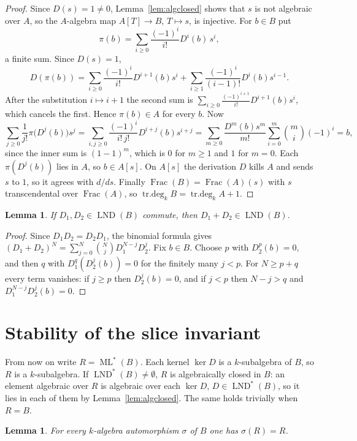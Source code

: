 \documentclass[11pt]{amsart}
\newtheorem{lemma}[theorem]{Lemma}
\theoremstyle{definition}
\DeclareMathOperator{\ML}{ML}
\DeclareMathOperator{\LND}{LND}
\DeclareMathOperator{\Frac}{Frac}
\DeclareMathOperator{\trdeg}{tr.deg}
\newcommand{\MLs}{\ML^{*}}
\newcommand{\LNDs}{\LND^{*}}
\newcommand{\td}[1]{\trdeg_k #1}
\begin{document}
\begin{proof}
Since $D(s)=1\neq0$, Lemma~\ref{lem:algclosed} shows that $s$ is not algebraic over $A$, so the $A$-algebra map $A[T]\to B$, $T\mapsto s$, is injective. For $b\in B$ put
\[
\pi(b)=\sum_{i\ge0}\frac{(-1)^i}{i!}D^i(b)\,s^i ,
\]
a finite sum. Since $D(s)=1$,
\[
D(\pi(b))=\sum_{i\ge0}\frac{(-1)^i}{i!}D^{i+1}(b)s^i+\sum_{i\ge1}\frac{(-1)^i}{(i-1)!}D^i(b)s^{i-1}.
\]
After the substitution $i\mapsto i+1$ the second sum is $\sum_{i\ge0}\frac{(-1)^{i+1}}{i!}D^{i+1}(b)s^i$, which cancels the first. Hence $\pi(b)\in A$ for every $b$. Now
\[
\sum_{j\ge0}\frac{1}{j!}\pi\bigl(D^j(b)\bigr)s^j=\sum_{i,j\ge0}\frac{(-1)^i}{i!\,j!}D^{i+j}(b)s^{i+j}=\sum_{m\ge0}\frac{D^m(b)s^m}{m!}\sum_{i=0}^m\binom{m}{i}(-1)^i=b,
\]
since the inner sum is $(1-1)^m$, which is $0$ for $m\ge1$ and $1$ for $m=0$. Each $\pi(D^j(b))$ lies in $A$, so $b\in A[s]$. On $A[s]$ the derivation $D$ kills $A$ and sends $s$ to $1$, so it agrees with $d/ds$. Finally $\Frac(B)=\Frac(A)(s)$ with $s$ transcendental over $\Frac(A)$, so $\td{B}=\td{A}+1$.
\end{proof}

\begin{lemma}\label{lem:commuting}
If $D_1,D_2\in\LND(B)$ commute, then $D_1+D_2\in\LND(B)$.
\end{lemma}

\begin{proof}
Since $D_1D_2=D_2D_1$, the binomial formula gives $(D_1+D_2)^N=\sum_{j=0}^N\binom Nj D_1^{N-j}D_2^{j}$. Fix $b\in B$. Choose $p$ with $D_2^p(b)=0$, and then $q$ with $D_1^q(D_2^j(b))=0$ for the finitely many $j<p$. For $N\ge p+q$ every term vanishes: if $j\ge p$ then $D_2^j(b)=0$, and if $j<p$ then $N-j>q$ and $D_1^{N-j}D_2^j(b)=0$.
\end{proof}

\section{Stability of the slice invariant}\label{sec:stable}

From now on write $R=\MLs(B)$. Each kernel $\ker D$ is a $k$-subalgebra of $B$, so $R$ is a $k$-subalgebra. If $\LNDs(B)\neq\emptyset$, $R$ is algebraically closed in $B$: an element algebraic over $R$ is algebraic over each $\ker D$, $D\in\LNDs(B)$, so it lies in each of them by Lemma~\ref{lem:algclosed}. The same holds trivially when $R=B$.

\begin{lemma}\label{lem:aut}
For every $k$-algebra automorphism $\sigma$ of $B$ one has $\sigma(R)=R$.
\end{lemma}
\end{document}
